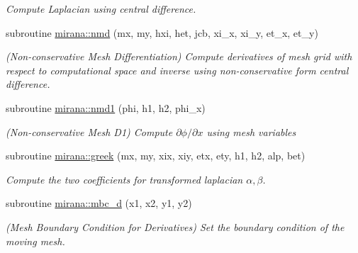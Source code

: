 \begin{DoxyCompactItemize}
\begin{DoxyCompactList}\small\item\em Compute Laplacian using central difference. \end{DoxyCompactList}\item 
subroutine \hyperlink{namespacemirana_a53c223d4530275ef3fc6a5820f5b0990}{mirana\+::nmd} (mx, my, hxi, het, jcb, xi\+\_\+x, xi\+\_\+y, et\+\_\+x, et\+\_\+y)
\begin{DoxyCompactList}\small\item\em (Non-\/conservative Mesh Differentiation) Compute derivatives of mesh grid with respect to computational space and inverse using non-\/conservative form central difference. \end{DoxyCompactList}\item 
subroutine \hyperlink{namespacemirana_a71faa480fd08e57cac1a862ab527971b}{mirana\+::nmd1} (phi, h1, h2, phi\+\_\+x)
\begin{DoxyCompactList}\small\item\em (Non-\/conservative Mesh D1) Compute $\partial\phi/\partial x$ using mesh variables \end{DoxyCompactList}\item 
subroutine \hyperlink{namespacemirana_a7530ea2e7b2dfe85f3a088d24de59f1d}{mirana\+::greek} (mx, my, xix, xiy, etx, ety, h1, h2, alp, bet)
\begin{DoxyCompactList}\small\item\em Compute the two coefficients for transformed laplacian $\alpha,\beta$. \end{DoxyCompactList}\item 
subroutine \hyperlink{namespacemirana_a65a514d206d0e8ae53253938d2aff553}{mirana\+::mbc\+\_\+d} (x1, x2, y1, y2)
\begin{DoxyCompactList}\small\item\em (Mesh Boundary Condition for Derivatives) Set the boundary condition of the moving mesh. \end{DoxyCompactList}\end{DoxyCompactItemize}
